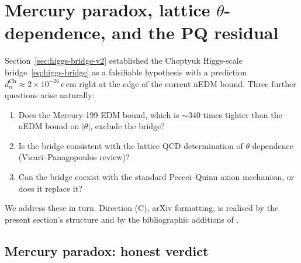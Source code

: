 %
%

\section{Mercury paradox, lattice \texorpdfstring{$\theta$}{theta}-dependence, and the PQ residual}
\label{sec:ABD-consolidated}

Section~\ref{sec:higgs-bridge-v2} established the Choptyuk Higgs-scale
bridge~\eqref{eq:higgs-bridge} as a falsifiable hypothesis with a
prediction $d_n^{\mathrm{Ch}}\approx 2\times 10^{-26}\,$e\,cm right at
the edge of the current nEDM bound.  Three further questions arise
naturally:
\begin{enumerate}[leftmargin=2em,itemsep=0.1em]
  \item[\textbf{(A)}] Does the Mercury-199 EDM bound, which is $\sim 340$
        times tighter than the nEDM bound on $|\theta|$, exclude the
        bridge?
  \item[\textbf{(B)}] Is the bridge consistent with the lattice QCD
        determination of $\theta$-dependence (Vicari--Panagopoulos
        review)?
  \item[\textbf{(D)}] Can the bridge coexist with the standard
        Peccei--Quinn axion mechanism, or does it replace it?
\end{enumerate}
We address these in turn.  Direction (C), arXiv formatting, is realised
by the present section's structure and by the bibliographic additions
of \cite{vicaripanagopoulos2009,pospelovritz2005,dmitrievflambaum2005,
devries2018nuclear,bonnEDM2024}.

\subsection{Mercury paradox: honest verdict}
\label{ssec:mercury-paradox}

